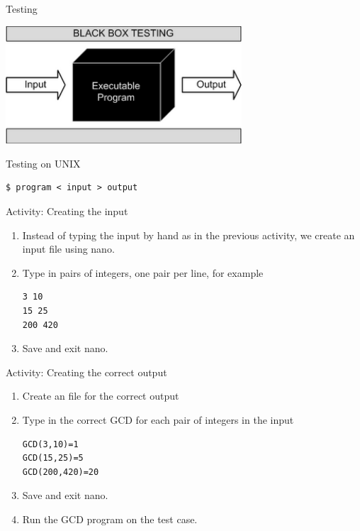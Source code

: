 \begin{frame}{Testing}
\begin{center}
\includegraphics[width=250pt]{bbtesting}
\end{center}
\end{frame}

\begin{frame}[fragile]{Testing on UNIX}
\begin{Large}
\begin{verbatim}
$ program < input > output
\end{verbatim}
\end{Large}
\end{frame}

\begin{frame}[fragile]{Activity: Creating the input}
\begin{enumerate}
\item Instead of typing the input by hand as in the previous activity, we create
an input file using nano. 
\item Type in pairs of integers, one pair per line, for example
\begin{verbatim}
3 10
15 25
200 420
\end{verbatim}
\item Save and exit nano. 
\end{enumerate}
\end{frame}

\begin{frame}[fragile]{Activity: Creating the correct output}
\begin{enumerate}
\item Create an file for the correct output
\item Type in the correct GCD for each pair of integers in the input
\begin{verbatim}
GCD(3,10)=1
GCD(15,25)=5
GCD(200,420)=20
\end{verbatim}
\item Save and exit nano.  
\item Run the GCD program on the test case. 
\end{enumerate}
\end{frame}

